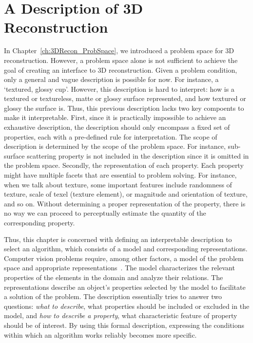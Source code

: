 
\chapter{A Description of 3D Reconstruction}
\label{ch:3DRecon_Desc}
In Chapter~\ref{ch:3DRecon_ProbSpace}, we introduced a problem space for 3D reconstruction. However, a problem space alone is not sufficient to achieve the goal of creating an interface to 3D reconstruction. Given a problem condition, only a general and vague description is possible for now. For instance, a `textured, glossy cup'. However, this description is hard to interpret: how is a textured or textureless, matte or glossy surface represented, and how textured or glossy the surface is. Thus, this previous description lacks two key compoents to make it interpretable. First, since it is practically impossible to achieve an exhaustive description, the description should only encompass a fixed set of properties, each with a pre-defined rule for interpretation. The scope of description is determined by the scope of the problem space. For instance, sub-surface scattering property is not included in the description since it is omitted in the problem space. Secondly, the representation of each property. Each property might have multiple facets that are essential to problem solving. For instance, when we talk about texture, some important features include randomness of texture, scale of texel (texture element), or magnitude and orientation of texture, and so on. Without determining a proper representation of the property, there is no way we can proceed to perceptually estimate the quantity of the corresponding property.

Thus, this chapter is concerned with defining an interpretable description to select an algorithm, which consists of a model and corresponding representations. Computer vision problems require, among other factors, a model of the problem space and appropriate representations~\cite{little1985phdthesis}. The model characterizes the relevant properties of the elements in the domain and analyze their relations. The representations describe an object's properties selected by the model to facilitate a solution of the problem. The description essentially tries to answer two questions: \textit{what to describe}, \ie what properties should be included or excluded in the model, and \textit{how to describe a property}, \ie what characteristic feature of property should be of interest. By using this formal description, expressing the conditions within which an algorithm works reliably becomes more specific.

